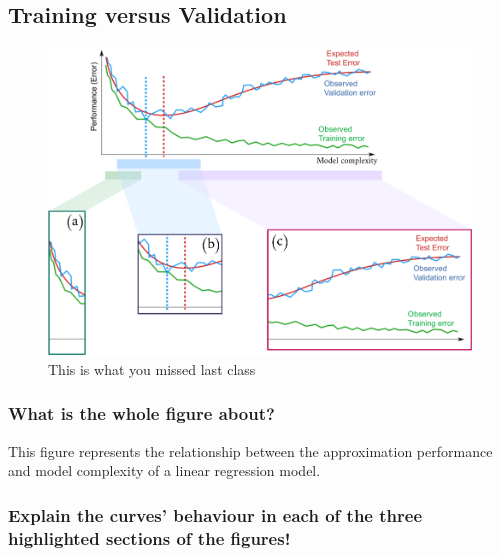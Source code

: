 \documentclass[12pt,a4paper]{article}
\begin{document}
\subsection*{Training versus Validation}

\begin{figure}[h!]
\begin{center}    
\includegraphics[width=1\textwidth,keepaspectratio]{figures/figure1}
\end{center}
\caption{This is what you missed last class}
\end{figure}

\subsubsection*{What is the whole figure about?}

This figure represents the relationship between the approximation performance and model complexity of a linear regression model.

\subsubsection*{Explain the curves' behaviour in each of the three highlighted sections of the figures!}
\end{document}
